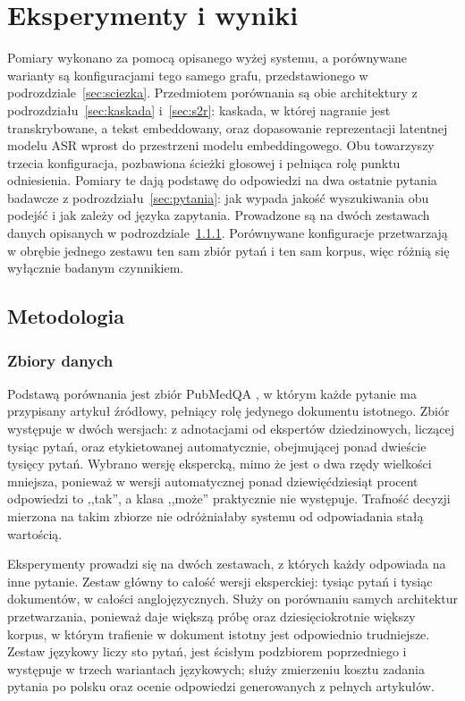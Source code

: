 \section{Eksperymenty i wyniki}
\label{sec:eksperymenty}
Pomiary wykonano za pomocą opisanego wyżej systemu, a porównywane warianty są konfiguracjami
tego samego grafu, przedstawionego w podrozdziale~\ref{sec:sciezka}. Przedmiotem porównania są
obie architektury z podrozdziału~\ref{sec:kaskada} i~\ref{sec:s2r}: kaskada, w której nagranie
jest transkrybowane, a tekst embeddowany, oraz dopasowanie reprezentacji latentnej modelu ASR
wprost do przestrzeni modelu embeddingowego. Obu towarzyszy trzecia konfiguracja, pozbawiona
ścieżki głosowej i pełniąca rolę punktu odniesienia. Pomiary te dają podstawę do odpowiedzi na
dwa ostatnie pytania badawcze z podrozdziału~\ref{sec:pytania}: jak wypada jakość wyszukiwania
obu podejść i jak zależy od języka zapytania. Prowadzone są na dwóch zestawach danych opisanych
w podrozdziale~\ref{sec:zbiory}. Porównywane konfiguracje przetwarzają w obrębie jednego zestawu
ten sam zbiór pytań i ten sam korpus, więc różnią się wyłącznie badanym czynnikiem.

\subsection{Metodologia}

\subsubsection{Zbiory danych}
\label{sec:zbiory}
Podstawą porównania jest zbiór PubMedQA \cite{jin2019pubmedqa}, w którym każde pytanie ma przypisany
artykuł źródłowy, pełniący rolę jedynego dokumentu istotnego. Zbiór występuje w dwóch
wersjach: z adnotacjami od ekspertów dziedzinowych, liczącej tysiąc pytań, oraz etykietowanej
automatycznie, obejmującej ponad dwieście tysięcy pytań. Wybrano wersję ekspercką, mimo że jest
o dwa rzędy wielkości mniejsza, ponieważ w wersji automatycznej ponad dziewięćdziesiąt procent odpowiedzi
to ,,tak'', a klasa ,,może'' praktycznie nie występuje. Trafność decyzji mierzona na takim zbiorze
nie odróżniałaby systemu od odpowiadania stałą wartością.

Eksperymenty prowadzi się na dwóch zestawach, z których każdy odpowiada na inne pytanie. Zestaw
główny to całość wersji eksperckiej: tysiąc pytań i tysiąc dokumentów, w całości
anglojęzycznych. Służy on porównaniu samych architektur przetwarzania, ponieważ daje większą próbę oraz
dziesięciokrotnie większy korpus, w którym trafienie w dokument istotny jest odpowiednio
trudniejsze. Zestaw językowy liczy sto pytań, jest ścisłym podzbiorem poprzedniego i występuje w
trzech wariantach językowych; służy zmierzeniu kosztu zadania pytania po polsku oraz ocenie
odpowiedzi generowanych z pełnych artykułów.

